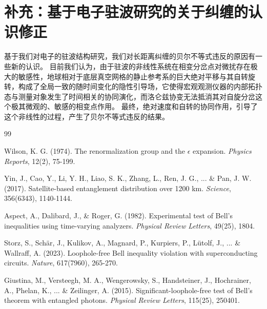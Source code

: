 \documentclass[12pt]{article}
\begin{document}
\section{补充：基于电子驻波研究的关于纠缠的认识修正}

基于我们对电子的驻波结构研究，我们对长距离纠缠的贝尔不等式违反的原因有一些新的认识。
目前我们认为，由于驻波的非线性系统在相变分岔点对微扰存在极大的敏感性，地球相对于底层真空网格的静止参考系的巨大绝对平移与其自转旋转，构成了全局一致的随时间变化的隐性引导场，它使得宏观观测仪器的内部拓扑态与测量对象发生了时间相关的协同演化，而洛仑兹协变无法抵消其对自旋分岔这个极其微观的、敏感的相变点作用。
最终，绝对速度和自转的协同作用，引导了这个非线性的过程，产生了贝尔不等式违反的结果。

\newpage
\begin{thebibliography}{99}

Wilson, K. G. (1974). The renormalization group and the $\epsilon$ expansion. \textit{Physics Reports}, 12(2), 75-199.

Yin, J., Cao, Y., Li, Y. H., Liao, S. K., Zhang, L., Ren, J. G., ... \& Pan, J. W. (2017). Satellite-based entanglement distribution over 1200 km. \textit{Science}, 356(6343), 1140-1144.

Aspect, A., Dalibard, J., \& Roger, G. (1982). Experimental test of Bell's inequalities using time-varying analyzers. \textit{Physical Review Letters}, 49(25), 1804.

Storz, S., Schär, J., Kulikov, A., Magnard, P., Kurpiers, P., Lütolf, J., ... \& Wallraff, A. (2023). Loophole-free Bell inequality violation with superconducting circuits. \textit{Nature}, 617(7960), 265-270.

Giustina, M., Versteegh, M. A., Wengerowsky, S., Handsteiner, J., Hochrainer, A., Phelan, K., ... \& Zeilinger, A. (2015). Significant-loophole-free test of Bell's theorem with entangled photons. \textit{Physical Review Letters}, 115(25), 250401.

\end{thebibliography}
\end{document}

